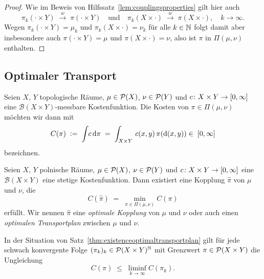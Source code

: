 \documentclass[../main/main.tex]{subfiles}
\begin{document}
	\begin{proof}
		Wie im Beweis von Hilfssatz~\ref{lem:couplingsproperties} gilt hier auch
		\[ \pi_k(\cdot \times Y) \; \xrightarrow{w} \; \pi(\cdot \times Y) \quad \text{und} \quad \pi_k(X \times \cdot) \; \xrightarrow{w} \; \pi(X \times \cdot), \quad k \to \infty \text{.} \]
		Wegen $\pi_k(\cdot \times Y) = \mu_k$ und $\pi_k(X \times \cdot) = \nu_k$ für alle $k \in \mathbb{N}$ folgt damit aber insbesondere auch $\pi(\cdot \times Y) = \mu$ und $\pi(X \times \cdot) = \nu$, also
		ist $\pi$ in $\Pi(\mu, \nu)$ enthalten.
	\end{proof}

	\subsection{Optimaler Transport}

	\begin{Definition}
		Seien $X$, $Y$ topologische Räume, $\mu \in \mathcal{P}(X)$, $\nu \in \mathcal{P}(Y)$ und $c \colon X \times Y \to [0, \infty]$ eine $\mathcal{B}(X \times Y)$-messbare Kostenfunktion.
		Die Kosten von $\pi \in \Pi(\mu, \nu)$ möchten wir dann mit
		\[ C(\pi) \; \vcentcolon = \; \int_{} \, c \, \mathrm{d}\pi \; = \; \int_{X \times Y} \, c(x, y) \, \pi(\mathrm{d}(x, y)) \in \; [0, \infty] \]
		bezeichnen.
	\end{Definition}

	\begin{Satz}
		\label{thm:existenceoptimaltransportplan}
		Seien $X$, $Y$ polnische Räume, $\mu \in \mathcal{P}(X)$, $\nu \in \mathcal{P}(Y)$ und $c \colon X \times Y \to [0, \infty]$ eine $\mathcal{B}(X \times Y)$ eine stetige 
		Kostenfunktion. Dann existiert eine Kopplung $\hat{\pi}$ von $\mu$ und $\nu$, die 
		\[ C(\hat{\pi}) \; = \; \min_{\pi \in \Pi(\mu, \nu)} C(\pi) \]
		erfüllt. Wir nennen $\hat{\pi}$ eine \emph{optimale Kopplung} von $\mu$ und $\nu$ oder auch einen \emph{optimalen Transportplan} zwischen $\mu$ und $\nu$.
	\end{Satz}

	\begin{Hilfssatz}
		\label{lem:lsccost}
		In der Situation von Satz~\ref{thm:existenceoptimaltransportplan} gilt für jede schwach konvergente Folge $(\pi_k)_k \in \mathcal{P}(X \times Y)^{\mathbb{N}}$ mit Grenzwert $\pi \in \mathcal{P}(X \times Y)$ die Ungleichung
		\[ C(\pi) \; \leq \; \liminf_{k \to \infty} C(\pi_k) \text{.} \]
	\end{Hilfssatz}
\end{document}
